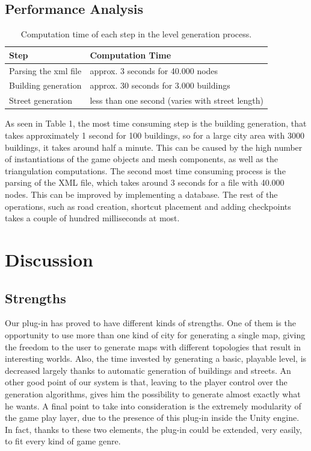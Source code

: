 \documentclass[conference]{IEEEtran}
\begin{document}
\subsection{Performance Analysis}

\begin{table}[h]
\begin{center}
\renewcommand{\arraystretch}{1}

\label{tab1}
\begin{tabular}{|p{2.4cm}|p{5.6cm}|}
\hline
Step & Computation Time\\
\hline \hline
Parsing the xml file & approx. 3 seconds for 40.000 nodes \\ \hline
Building generation & approx. 30 seconds for 3.000 buildings \\ \hline
Street generation & less than one second (varies with street length) \\ \hline

\end{tabular}
\caption{Computation time of each step in the level generation process.}
\end{center}
\end{table}

As seen in Table 1, the most time consuming step is the building generation, that takes approximately 1 second for 100 buildings, so for a large city area with 3000 buildings, it takes around half a minute. This can be caused by the high number of instantiations of the game objects and mesh components, as well as the triangulation computations. The second most time consuming process is the parsing of the XML file, which takes around 3 seconds for a file with 40.000 nodes. This can be improved by implementing a database. The rest of the operations, such as road creation, shortcut placement and adding checkpoints takes a couple of hundred milliseconds at most.

\section{Discussion}

\subsection{Strengths}

Our plug-in has proved to have different kinds of strengths. One of them is the opportunity to use more than one kind of city for generating a single map, giving the freedom to the user to generate maps with different topologies that result in interesting worlds. Also, the time invested by generating a basic, playable level, is decreased largely thanks to automatic generation of buildings and streets. An other good point of our system is that, leaving to the player control over the generation algorithms, gives him the possibility to generate almost exactly what he wants. A final point to take into consideration is the extremely modularity of the game play layer, due to the presence of this plug-in inside the Unity engine. In fact, thanks to these two elements, the plug-in could be extended, very easily, to fit every kind of game genre. 
\end{document}

